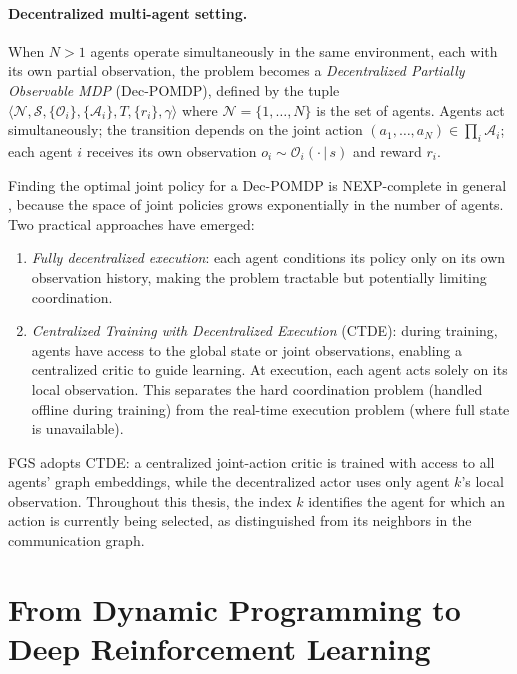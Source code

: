 \paragraph{Decentralized multi-agent setting.}
When $N > 1$ agents operate simultaneously in the same environment, each with its own partial observation, the problem becomes a \emph{Decentralized Partially Observable MDP} (Dec-POMDP), defined by the tuple $\langle \mathcal{N}, \mathcal{S}, \{\mathcal{O}_i\}, \{\mathcal{A}_i\}, T, \{r_i\}, \gamma \rangle$ where $\mathcal{N} = \{1,\ldots,N\}$ is the set of agents. Agents act simultaneously; the transition depends on the joint action $(a_1,\ldots,a_N) \in \prod_i \mathcal{A}_i$; each agent $i$ receives its own observation $o_i \sim \mathcal{O}_i(\cdot\,|\,s)$ and reward $r_i$.

Finding the optimal joint policy for a Dec-POMDP is NEXP-complete in general \citep{bernstein2002complexity}, because the space of joint policies grows exponentially in the number of agents. Two practical approaches have emerged:
\begin{enumerate}
  \item \emph{Fully decentralized execution}: each agent conditions its policy only on its own observation history, making the problem tractable but potentially limiting coordination.
  \item \emph{Centralized Training with Decentralized Execution} (CTDE): during training, agents have access to the global state or joint observations, enabling a centralized critic to guide learning. At execution, each agent acts solely on its local observation. This separates the hard coordination problem (handled offline during training) from the real-time execution problem (where full state is unavailable).
\end{enumerate}
FGS adopts CTDE: a centralized joint-action critic is trained with access to all agents' graph embeddings, while the decentralized actor uses only agent $k$'s local observation. Throughout this thesis, the index $k$ identifies the agent for which an action is currently being selected, as distinguished from its neighbors in the communication graph.

\section{From Dynamic Programming to Deep Reinforcement Learning}
\label{sec:TheoreticalBackground_TechnicalFoundations}


